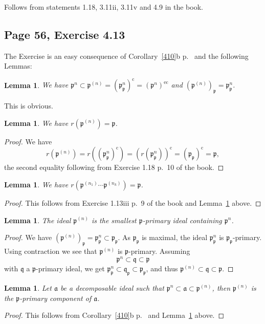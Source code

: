 \documentclass[parskip=half,fontsize=12pt]{scrartcl}%
\newcommand{\oo}{\operatorname}\newcommand{\ooo}{\operatorname*}
\newcommand{\mf}{\mathfrak}
\newcommand{\aaa}{\mf a}
\newcommand{\ppp}{\mf p}
\newcommand{\qqq}{\mf q}
\newtheorem{lem}[thm]{Lemma}
\begin{document}
Follows from statements 1.18, 3.11ii, 3.11v and 4.9 in the book.

\subsection{Page 56, Exercise 4.13}%

The Exercise is an easy consequence of Corollary~\ref{410}b p.~\pageref{410} and the following Lemmas:

\begin{lem}
We have $\ppp^n\subset\ppp^{(n)}=\left(\ppp_\ppp^n\right)^{\oo c}=\left(\ppp^n\right)^{\oo{ec}}$ and $\left(\ppp^{(n)}\right)_\ppp=\ppp_\ppp^n$. 
\end{lem}
This is obvious.

\begin{lem}\label{413a}
We have $r\left(\ppp^{(n)}\right)=\ppp$. 
\end{lem}
\begin{proof}
We have 
$$
r\left(\ppp^{(n)}\right)=r\left(\left(\ppp_\ppp^n\right)^{\oo c}\right)=\left(r\left(\ppp_\ppp^n\right)\right)^{\oo c}=(\ppp_\ppp)^{\oo c}=\ppp,
$$ 
the second equality following from Exercise 1.18 p.~10 of the book. 
\end{proof} 

\begin{lem}
We have $r\left(\ppp^{(n_1)}\cdots\ppp^{(n_k)}\right)=\ppp$. 
\end{lem}
\begin{proof}
This follows from Exercise 1.13iii p.~9 of the book and Lemma~\ref{413a} above.
\end{proof}

\begin{lem}\label{413b}
The ideal $\ppp^{(n)}$ is the smallest $\ppp$-primary ideal containing $\ppp^n$. 
\end{lem}
\begin{proof}
We have $(\ppp^{(n)})_\ppp=\ppp_\ppp^{n}\subset\ppp_\ppp$. As $\ppp_\ppp$ is maximal, the ideal $\ppp^n_\ppp$ is $\ppp_\ppp$-primary. Using contraction we see that $\ppp^{(n)}$ is $\ppp$-primary. Assuming 
$$
\ppp^n\subset\qqq\subset\ppp
$$ 
with $\qqq$ a $\ppp$-primary ideal, we get $\ppp^n_\ppp\subset\qqq_\ppp\subset\ppp_\ppp$, and thus $\ppp^{(n)}\subset\qqq\subset\ppp$. 
\end{proof}

\begin{lem}
Let $\aaa$ be a decomposable ideal such that $\ppp^n\subset\aaa\subset\ppp^{(n)}$, then $\ppp^{(n)}$ is the $\ppp$-primary component of $\aaa$. 
\end{lem}
\begin{proof}
This follows from Corollary~\ref{410}b p.~\pageref{410} and Lemma~\ref{413b} above.
\end{proof}
\end{document}
